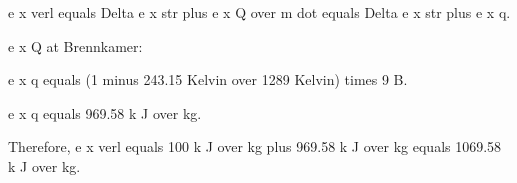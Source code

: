 e x verl equals Delta e x str plus e x Q over m dot equals Delta e x str plus e x q. 

e x Q at Brennkamer: 

e x q equals (1 minus 243.15 Kelvin over 1289 Kelvin) times 9 B. 

e x q equals 969.58 k J over kg. 

Therefore, e x verl equals 100 k J over kg plus 969.58 k J over kg equals 1069.58 k J over kg.